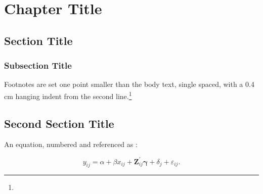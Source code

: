 
\chapter{Chapter Title}
\label{ch:study-one}



\blindtext

\section{Section Title}
\label{sec:study-one-01}

\blindtext[2]

\subsection{Subsection Title}
\label{subsec:study-one-01}

Footnotes are set one point smaller than the body text, single spaced, with
a 0.4 cm hanging indent from the second line.\footnote{\blindtext[1]}

\blindtext

\section{Second Section Title}
\label{sec:study-one-02}

An equation, numbered and referenced as :

\begin{equation}
  y_{ij} = \alpha + \beta x_{ij}
           + \mathbf{Z}_{ij}^{\prime}\boldsymbol{\gamma}
           + \delta_j + \varepsilon_{ij}.
  \label{eq:example}
\end{equation}

\blindtext
